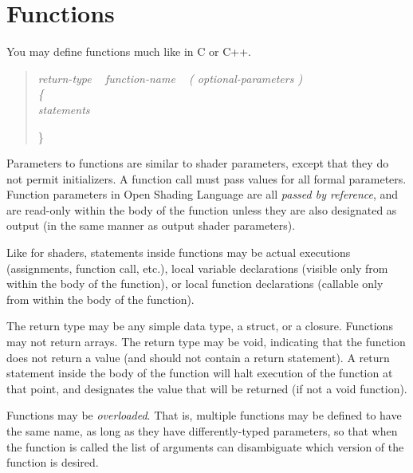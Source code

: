 \documentclass[11pt,letterpaper]{book}
\def\langname{Open Shading Language\xspace}
\begin{document}




\newpage
\section{Functions}
\label{sec:functions}

You may define functions much like in C or C++.

\begin{quote}
\em
return-type ~ function-name ~ {\rm\cf (} optional-parameters {\rm\cf )} \\
\rm
{\cf \{ } \\
\em
\spc statements

{\cf \} }
\end{quote}

Parameters to functions are similar to shader parameters, except that
they do not permit initializers.  A function call must pass values for
all formal parameters.  Function parameters in \langname are all
\emph{passed by reference}, and are read-only within the body of the
function unless they are also designated as {\cf output} (in the same
manner as output shader parameters).

Like for shaders, statements inside functions may be actual executions
(assignments, function call, etc.), local variable declarations (visible
only from within the body of the function), or local function
declarations (callable only from within the body of the function).

The return type may be any simple data type, a {\cf struct}, or a {\cf
  closure}.  Functions may not return arrays.  The return type may be
{\cf void}, indicating that the function does not return a value (and
should not contain a {\cf return} statement).  A {\cf return} statement
inside the body of the function will halt execution of the function at
that point, and designates the value that will be returned (if not a
{\cf void} function).

Functions may be \emph{overloaded}.  That is, multiple functions may be
defined to have the same name, as long as they have differently-typed
parameters, so that when the function is called the list of arguments
can disambiguate which version of the function is desired.
\end{document}
